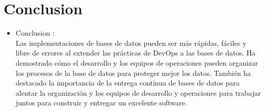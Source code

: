 \documentclass[preprint,12pt]{elsarticle}
\begin{document}
\section{Conclusion}
\begin{itemize}
\item Conclusion : \\


Las implementaciones de bases de datos pueden ser más rápidas, fáciles y libre de errores al extender las prácticas de DevOps a las bases de datos. Ha demostrado cómo el desarrollo y los equipos de operaciones pueden organizar los procesos de la base de datos para proteger mejor los datos. También ha destacado la importancia de la entrega continua de bases de datos para alentar la organización y los equipos de desarrollo y operaciones para trabajar juntos para construir y entregar un excelente software.

\end{itemize}

	
	\newpage
	
	 	
		 
\citep{referencia01}  
\citep{referencia02}  
\citep{referencia03}  
\citep{referencia04}  
\citep{referencia05}  
\citep{referencia06}  
\citep{referencia07}  
\citep{referencia08} 
\citep{referencia09}
\end{document}
